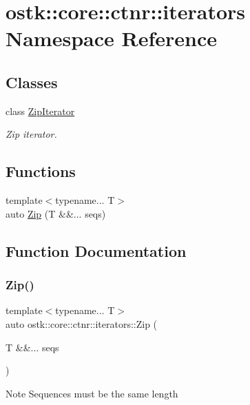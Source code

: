 \hypertarget{namespaceostk_1_1core_1_1ctnr_1_1iterators}{}\section{ostk\+:\+:core\+:\+:ctnr\+:\+:iterators Namespace Reference}
\label{namespaceostk_1_1core_1_1ctnr_1_1iterators}
\subsection*{Classes}
\begin{DoxyCompactItemize}
\item 
class \hyperlink{classostk_1_1core_1_1ctnr_1_1iterators_1_1_zip_iterator}{Zip\+Iterator}
\begin{DoxyCompactList}\small\item\em Zip iterator. \end{DoxyCompactList}\end{DoxyCompactItemize}
\subsection*{Functions}
\begin{DoxyCompactItemize}
\item 
{\footnotesize template$<$typename... T$>$ }\\auto \hyperlink{namespaceostk_1_1core_1_1ctnr_1_1iterators_aa7e81e205b0af92bf502873e9e3f3835}{Zip} (T \&\&... seqs)
\end{DoxyCompactItemize}


\subsection{Function Documentation}
\mbox{\label{namespaceostk_1_1core_1_1ctnr_1_1iterators_aa7e81e205b0af92bf502873e9e3f3835}} 
\subsubsection{\texorpdfstring{Zip()}{Zip()}}
{\footnotesize\ttfamily template$<$typename... T$>$ \\
auto ostk\+::core\+::ctnr\+::iterators\+::\+Zip (\begin{DoxyParamCaption}\item[{T \&\&...}]{seqs }\end{DoxyParamCaption})}

\begin{DoxyNote}{Note}
Sequences must be the same length 
\end{DoxyNote}
